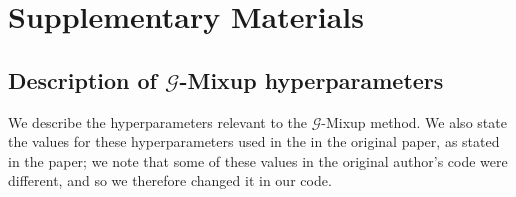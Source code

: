 \pagebreak

\appendix

\section{Supplementary Materials}

\subsection{Description of \texorpdfstring{$\mathcal{G}$}{G}-Mixup hyperparameters}\label{appendix:hyperparamets}

We describe the hyperparameters relevant to the $\mathcal{G}$-Mixup method. We also state the values for these hyperparameters used in the in the original paper, as stated in the paper; we note that some of these values in the original author's code were different, and so we therefore changed it in our code.

